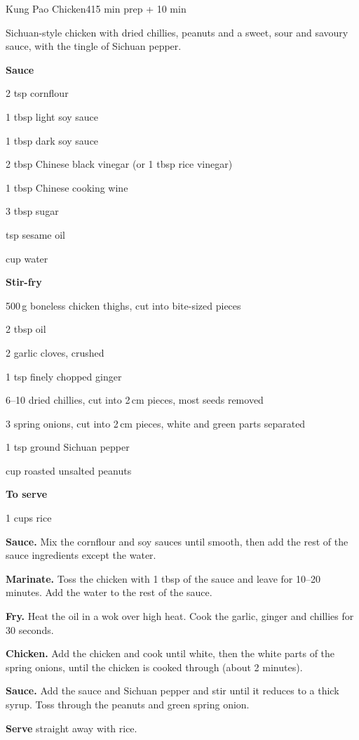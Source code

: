 \begin{recipebox}{Kung Pao Chicken}{4}{15 min prep + 10 min}

Sichuan-style chicken with dried chillies, peanuts and a sweet, sour and savoury
sauce, with the tingle of Sichuan pepper.

\begin{ingredients}
  \item[] \textbf{Sauce}
  \item 2 tsp cornflour
  \item 1 tbsp light soy sauce
  \item 1 tbsp dark soy sauce
  \item 2 tbsp Chinese black vinegar (or 1 tbsp rice vinegar)
  \item 1 tbsp Chinese cooking wine
  \item 3 tbsp sugar
  \item {} tsp sesame oil
  \item {} cup water
  \item[] \textbf{Stir-fry}
  \item 500\,g boneless chicken thighs, cut into bite-sized pieces
  \item 2 tbsp oil
  \item 2 garlic cloves, crushed
  \item 1 tsp finely chopped ginger
  \item 6--10 dried chillies, cut into 2\,cm pieces, most seeds removed
  \item 3 spring onions, cut into 2\,cm pieces, white and green parts separated
  \item 1 tsp ground Sichuan pepper
  \item {} cup roasted unsalted peanuts
  \item[] \textbf{To serve}
  \item 1 cups rice
\end{ingredients}

\begin{method}
  \item \textbf{Sauce.} Mix the cornflour and soy sauces until smooth, then add the
        rest of the sauce ingredients except the water.
  \item \textbf{Marinate.} Toss the chicken with 1 tbsp of the sauce
        and leave for 10--20 minutes. Add the water to the rest of the sauce.
  \item \textbf{Fry.} Heat the oil in a wok over high heat. Cook the garlic, ginger
        and chillies for 30 seconds.
  \item \textbf{Chicken.} Add the chicken and cook until white, then the white parts
        of the spring onions, until the chicken is cooked through (about 2 minutes).
  \item \textbf{Sauce.} Add the sauce and Sichuan pepper and stir until it reduces to
        a thick syrup. Toss through the peanuts and green spring onion.
  \item \textbf{Serve} straight away with rice.
\end{method}


\end{recipebox}
